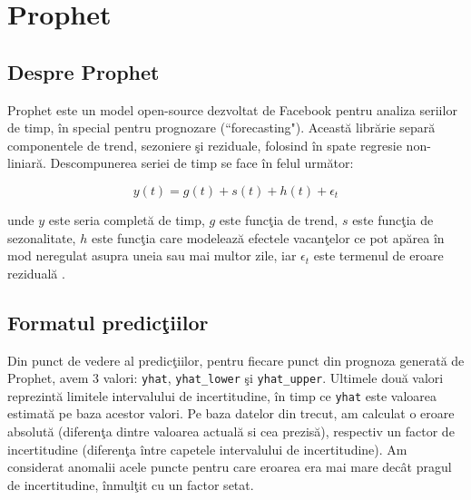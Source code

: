 \chapter {Prophet}

\section {Despre Prophet}

\noindent Prophet \cite{prophet} este un model open-source dezvoltat de Facebook pentru analiza seriilor de timp, \^ in special pentru prognozare (``forecasting"). Aceast\u a libr\u arie separ\u a componentele de trend, sezoniere \c si reziduale, folosind \^ in spate regresie non-liniar\u a. Descompunerea seriei de timp se face \^ in felul urm\u ator: 

$$ y(t) = g(t) + s(t) + h(t) + \epsilon_t$$

unde $y$ este seria complet\u a de timp, $g$ este func\c tia de trend, $s$ este func\c tia de sezonalitate, $h$ este func\c tia care modeleaz\u a efectele vacan\c telor ce pot ap\u area \^ in mod neregulat asupra uneia sau mai multor zile, iar $\epsilon_t$ este termenul de eroare rezidual\u a \cite{prophet}. \\


\section {Formatul predic\c tiilor}

\noindent Din punct de vedere al predic\c tiilor, pentru fiecare punct din prognoza generat\u a de Prophet, avem $3$ valori: \texttt{yhat}, \texttt{yhat\_lower} \c si \texttt{yhat\_upper}. Ultimele dou\u a valori reprezint\u a limitele intervalului de incertitudine, \^ in timp ce \texttt{yhat} este valoarea estimat\u a pe baza acestor valori. Pe baza datelor din trecut, am calculat o eroare absolut\u a (diferen\c ta dintre valoarea actual\u a si cea prezis\u a), respectiv un factor de incertitudine (diferen\c ta \^ intre capetele intervalului de incertitudine). Am considerat anomalii acele puncte pentru care eroarea era mai mare dec\^ at pragul de incertitudine, \^ inmul\c tit cu un factor setat. \\


